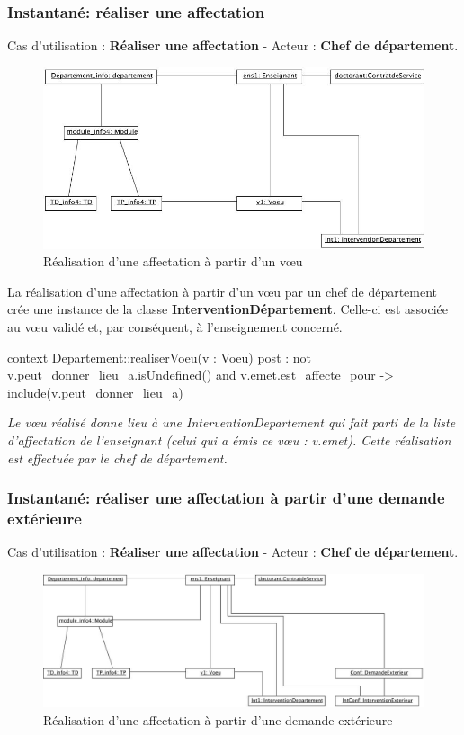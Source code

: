  \subsubsection{Instantané: réaliser une affectation}
 \indent Cas d'utilisation : \textbf{Réaliser une affectation} - Acteur : \textbf{Chef de département}.
 \begin{figure}[!htbp]
 \begin{center}
 \includegraphics[width=12cm]{fig/3-RealisationVoeu.jpg}
 \caption{Réalisation d'une affectation à partir d'un v\oe u}
 \end{center}
 \end{figure}

 \indent La réalisation d'une affectation à partir d'un v\oe u par un chef de département crée une instance de la classe \textbf{InterventionDépartement}. Celle-ci est associée au v\oe u validé et, par conséquent, à l'enseignement concerné.

 \begin{ocl}
 context Departement::realiserVoeu(v : Voeu)
 post : not v.peut_donner_lieu_a.isUndefined()
        and v.emet.est_affecte_pour -> include(v.peut_donner_lieu_a)
 \end{ocl}
 
 \emph{Le v\oe u réalisé donne lieu à une InterventionDepartement qui fait parti de la liste d'affectation de l'enseignant (celui qui a émis ce v\oe u : v.emet). Cette réalisation est effectuée par le chef de département.}


 \subsubsection{Instantané: réaliser une affectation à partir d'une demande extérieure}
 \indent  Cas d'utilisation : \textbf{Réaliser une affectation} - Acteur : \textbf{Chef de département}.
 \begin{figure}[!htbp]
 \begin{center}
 \includegraphics[width=14cm]{fig/6-RealisationDemandeExterieur.jpg}
 \caption{Réalisation d'une affectation à partir d'une demande extérieure}
 \end{center}
 \end{figure}

